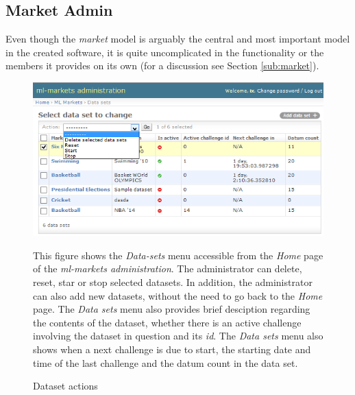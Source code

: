 \documentclass[bsc,frontabs,twoside,singlespacing,parskip,deptreport]{infthesis}     %
\begin{document}
\subsection{Market Admin}

	Even though the {\it market} model is arguably the central and most important model in the created software, it is quite uncomplicated in the functionality or the members it provides on its own (for a discussion see Section \ref{sub:market}).  


\begin{figure}

\caption{Dataset actions}
\includegraphics[width=\textwidth]{figures/admin-dataset-actions(c).png}

\label{fig:dataset-actions}
{This figure shows the {\it Data-sets} menu accessible from the {\it Home} page of the {\it ml-markets administration}. The administrator can delete, reset, star or stop selected datasets. In addition, the administrator can also add new datasets, without the need to go back to the  {\it Home} page. The {\it Data sets} menu also provides brief desciption regarding the contents of the dataset, whether there is an active challenge involving the dataset in question and its {\it id}. The {\it Data sets} menu also shows when a next challenge is due to start, the starting date and time of the last challenge and the datum count in the data set.} 
\end{figure}
\end{document}
